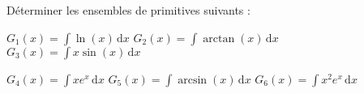 
\begin{exercice}\label{exoautoanalyseCTU-21}




Déterminer les ensembles de  primitives suivants :

$G_{1}(x)=\displaystyle\int\ln (x) \,\mathrm dx$ 
\qquad $G_{2}(x)=\displaystyle\int\arctan (x) \,\mathrm dx$ 
\qquad $G_{3}(x)=\displaystyle\int x\sin (x) \,\mathrm dx$ 

$G_{4}(x)=\displaystyle\int xe^x  \,\mathrm dx$ 
\qquad $G_{5}(x)=\displaystyle\int\arcsin (x) \,\mathrm dx$ 
\qquad $G_{6}(x)=\displaystyle\int x^2e^x  \,\mathrm dx$ 





\end{exercice}
